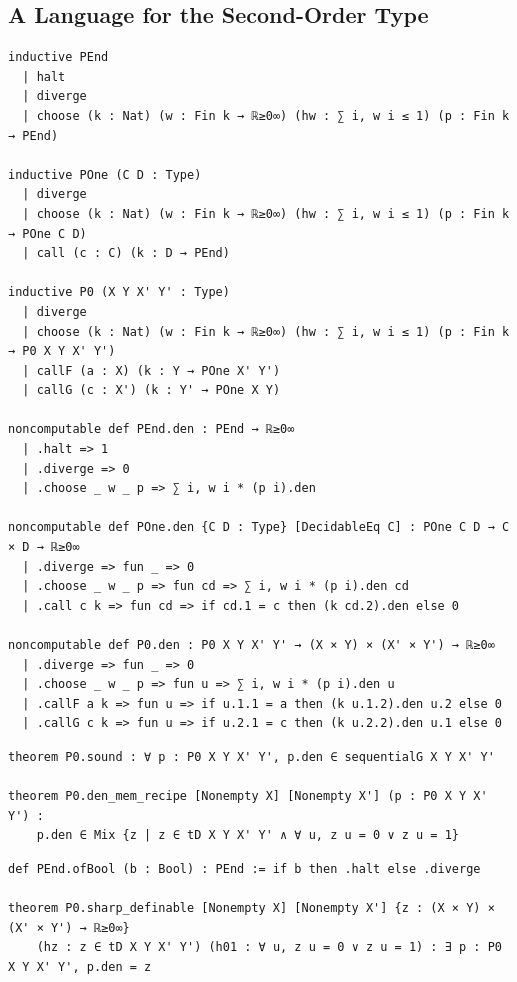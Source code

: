 \subsection{A Language for the Second-Order Type}

\label{lean:proglang}
\begin{lstlisting}
inductive PEnd
  | halt
  | diverge
  | choose (k : Nat) (w : Fin k → ℝ≥0∞) (hw : ∑ i, w i ≤ 1) (p : Fin k → PEnd)

inductive POne (C D : Type)
  | diverge
  | choose (k : Nat) (w : Fin k → ℝ≥0∞) (hw : ∑ i, w i ≤ 1) (p : Fin k → POne C D)
  | call (c : C) (k : D → PEnd)

inductive P0 (X Y X' Y' : Type)
  | diverge
  | choose (k : Nat) (w : Fin k → ℝ≥0∞) (hw : ∑ i, w i ≤ 1) (p : Fin k → P0 X Y X' Y')
  | callF (a : X) (k : Y → POne X' Y')
  | callG (c : X') (k : Y' → POne X Y)

noncomputable def PEnd.den : PEnd → ℝ≥0∞
  | .halt => 1
  | .diverge => 0
  | .choose _ w _ p => ∑ i, w i * (p i).den

noncomputable def POne.den {C D : Type} [DecidableEq C] : POne C D → C × D → ℝ≥0∞
  | .diverge => fun _ => 0
  | .choose _ w _ p => fun cd => ∑ i, w i * (p i).den cd
  | .call c k => fun cd => if cd.1 = c then (k cd.2).den else 0

noncomputable def P0.den : P0 X Y X' Y' → (X × Y) × (X' × Y') → ℝ≥0∞
  | .diverge => fun _ => 0
  | .choose _ w _ p => fun u => ∑ i, w i * (p i).den u
  | .callF a k => fun u => if u.1.1 = a then (k u.1.2).den u.2 else 0
  | .callG c k => fun u => if u.2.1 = c then (k u.2.2).den u.1 else 0
\end{lstlisting}

\label{lean:proglang-sound}
\begin{lstlisting}
theorem P0.sound : ∀ p : P0 X Y X' Y', p.den ∈ sequentialG X Y X' Y'

theorem P0.den_mem_recipe [Nonempty X] [Nonempty X'] (p : P0 X Y X' Y') :
    p.den ∈ Mix {z | z ∈ tD X Y X' Y' ∧ ∀ u, z u = 0 ∨ z u = 1}
\end{lstlisting}

\label{lean:proglang-definable}
\begin{lstlisting}
def PEnd.ofBool (b : Bool) : PEnd := if b then .halt else .diverge

theorem P0.sharp_definable [Nonempty X] [Nonempty X'] {z : (X × Y) × (X' × Y') → ℝ≥0∞}
    (hz : z ∈ tD X Y X' Y') (h01 : ∀ u, z u = 0 ∨ z u = 1) : ∃ p : P0 X Y X' Y', p.den = z
\end{lstlisting}

